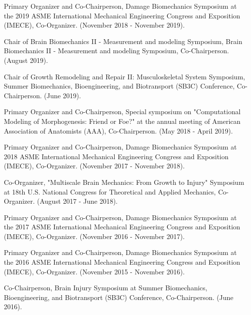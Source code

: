 \documentclass[a4paper,10pt]{article}
\begin{document}
        \noindent Primary Organizer and Co-Chairperson, Damage Biomechanics Symposium at the 2019 ASME International Mechanical Engineering Congress and Exposition (IMECE), Co-Organizer. (November 2018 - November 2019). \vspace{0.25cm}
        
        \noindent Chair of Brain Biomechanics II - Measurement and modeling Symposium, Brain Biomechanics II - Measurement and modeling Symposium, Co-Chairperson. (August 2019). \vspace{0.25cm}
        
        \noindent Chair of Growth Remodeling and Repair II: Musculoskeletal System Symposium, Summer Biomechanics, Bioengineering, and Biotransport (SB3C) Conference, Co-Chairperson. (June 2019).\vspace{0.25cm}
        
        \noindent Primary Organizer and Co-Chairperson, Special symposium on "Computational Modeling of Morphogenesis: Friend or Foe?" at the annual meeting of American Association of Anatomists (AAA), Co-Chairperson. (May 2018 - April 2019). \vspace{0.25cm}
        
        \noindent Primary Organizer and Co-Chairperson, Damage Biomechanics Symposium at 2018 ASME International Mechanical Engineering Congress and Exposition (IMECE), Co-Organizer. (November 2017 - November 2018). \vspace{0.25cm}
        
        \noindent Co-Organizer, "Multiscale Brain Mechanics: From Growth to Injury" Symposium at 18th U.S. National Congress for Theoretical and Applied Mechanics, Co-Organizer. (August 2017 - June 2018). \vspace{0.25cm}
        
        \noindent Primary Organizer and Co-Chairperson, Damage Biomechanics Symposium at the 2017 ASME International Mechanical Engineering Congress and Exposition (IMECE), Co-Organizer. (November 2016 - November 2017). \vspace{0.25cm}
        
        \noindent Primary Organizer and Co-Chairperson, Damage Biomechanics Symposium at the 2016 ASME International Mechanical Engineering Congress and Exposition (IMECE), Co-Organizer. (November 2015 - November 2016). \vspace{0.25cm}
        
        \noindent Co-Chairperson, Brain Injury Symposium at Summer Biomechanics, Bioengineering, and Biotransport (SB3C) Conference, Co-Chairperson. (June 2016).\vspace{0.25cm}
        
\end{document}
